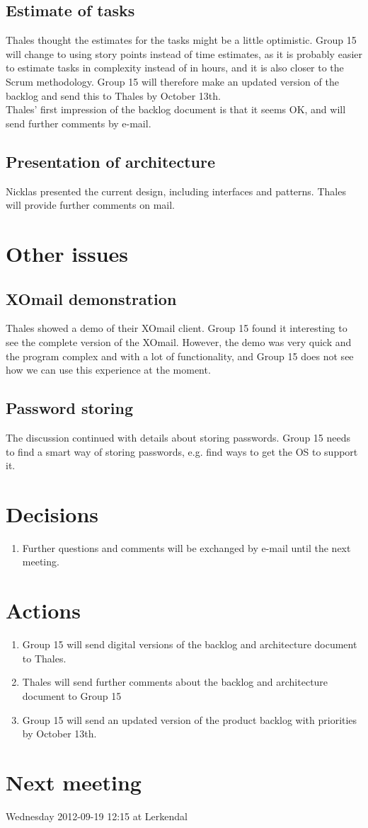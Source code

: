 \documentclass[a4paper,12pt]{article}
\begin{document}
\subsection{Estimate of tasks}
Thales thought the estimates for the tasks might be a little optimistic. Group 15 will change to using story points instead of time estimates, as it is probably easier to estimate tasks in complexity instead of in hours, and it is also closer to the Scrum methodology. Group 15 will therefore make an updated version of the backlog and send this to Thales by October 13th.\\
Thales’ first impression of the backlog document is that it seems OK, and will send further comments by e-mail.
\subsection{Presentation of architecture}
Nicklas presented the current design, including interfaces and patterns. Thales will provide further comments on mail.
\section{Other issues}
\subsection{XOmail demonstration}
Thales showed a demo of their XOmail client. Group 15 found it interesting to see the complete version of the XOmail. However, the demo was very quick and the program complex and with a lot of functionality, and Group 15 does not see how we can use this experience at the moment.
\subsection{Password storing}
The discussion continued with details about storing passwords. Group 15 needs to find a smart way of storing passwords, e.g. find ways to get the OS to support it.
\section{Decisions}
\begin{enumerate}
\item
Further questions and comments will be exchanged by e-mail until the next meeting.
\end{enumerate}
\section{Actions}
\begin{enumerate}
\item
Group 15 will send digital versions of the backlog and architecture document to Thales.
\item
Thales will send further comments about the backlog and architecture document to Group 15
\item
Group 15 will send an updated version of the product backlog with priorities by October 13th.
\end{enumerate}
\section{Next meeting}
Wednesday 2012-09-19 12:15 at Lerkendal
\end{document}
